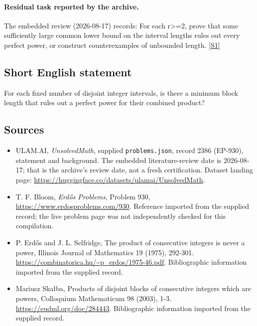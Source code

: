 \documentclass[11pt,a4paper]{article}
\newcommand{\sref}[2]{\hyperlink{source:#1:#2}{[S#2]}}
\begin{document}
\paragraph{Residual task reported by the archive.}

The embedded review (2026-08-17) records: For each r>=2, prove that some sufficiently large common lower bound on the interval lengths rules out every perfect power, or construct counterexamples of unbounded length. \sref{2386}{1}

\subsection{Short English statement}

For each fixed number of disjoint integer intervals, is there a minimum block length that rules out a perfect power for their combined product?

\subsection{Sources}

{\small

\begin{itemize}

\item[\hypertarget{source:2386:1}{S1}] ULAM.AI, \emph{UnsolvedMath}, supplied \texttt{problems.json}, record 2386 (EP-930), statement and background. The embedded literature-review date is 2026-08-17; that is the archive’s review date, not a fresh certification. Dataset landing page: \url{https://huggingface.co/datasets/ulamai/UnsolvedMath}.

\item[\hypertarget{source:2386:2}{S2}] T. F. Bloom, \emph{Erdős Problems}, Problem 930, \url{https://www.erdosproblems.com/930}. Reference imported from the supplied record; the live problem page was not independently checked for this compilation.

\item[\hypertarget{source:2386:3}{S3}] P. Erdős and J. L. Selfridge, The product of consecutive integers is never a power, Illinois Journal of Mathematics 19 (1975), 292-301. \url{https://combinatorica.hu/~p_erdos/1975-46.pdf}. Bibliographic information imported from the supplied record.

\item[\hypertarget{source:2386:4}{S4}] Mariusz Skałba, Products of disjoint blocks of consecutive integers which are powers, Colloquium Mathematicum 98 (2003), 1-3. \url{https://eudml.org/doc/284443}. Bibliographic information imported from the supplied record.

\end{itemize}

}

\label{end:2386}
\end{document}
